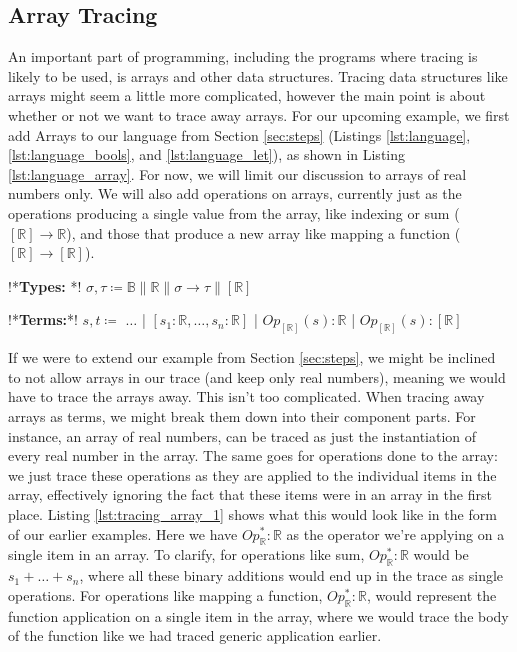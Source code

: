     \subsection{Array Tracing} \label{sec:arrays}
        An important part of programming, including the programs where tracing is likely to be used, is arrays and other data structures.
        Tracing data structures like arrays might seem a little more complicated, however the main point is about whether or not we want to trace away arrays.
        For our upcoming example, we first add Arrays to our language from Section \ref{sec:steps} (Listings \ref{lst:language}, \ref{lst:language_bools}, and \ref{lst:language_let}), as shown in Listing \ref{lst:language_array}.
        For now, we will limit our discussion to arrays of real numbers only.
        We will also add operations on arrays, currently just as the operations producing a single value from the array, like indexing or sum ($[\mathbb{R}]\to\mathbb{R}$), and those that produce a new array like mapping a function ($[\mathbb{R}]\to[\mathbb{R}]$).

        \begin{quicklst}[caption=Adding arrays, label=lst:language_array, gobble=12]
            !*\textbf{Types: }*!
                $\sigma,\tau\coloneqq\mathbb{B}\|\mathbb{R}\|\sigma\to\tau\|[\mathbb{R}]$

            !*\textbf{Terms:}*!
                $s,t\coloneqq$
                    $\dots$
                  | $[s_1:\mathbb{R},\dots,s_n:\mathbb{R}]$
                  | $Op_{[\mathbb{R}]}(s):\mathbb{R}$
                  | $Op_{[\mathbb{R}]}(s):[\mathbb{R}]$
        \end{quicklst}
        
        If we were to extend our example from Section \ref{sec:steps}, we might be inclined to not allow arrays in our trace (and keep only real numbers), meaning we would have to trace the arrays away.
        This isn't too complicated.
        When tracing away arrays as terms, we might break them down into their component parts.
        For instance, an array of real numbers, can be traced as just the instantiation of every real number in the array.
        The same goes for operations done to the array: we just trace these operations as they are applied to the individual items in the array, effectively ignoring the fact that these items were in an array in the first place.
        Listing \ref{lst:tracing_array_1} shows what this would look like in the form of our earlier examples.
        Here we have $Op^*_\mathbb{R}:\mathbb{R}$ as the operator we're applying on a single item in an array.
        To clarify, for operations like sum, $Op^*_\mathbb{R}:\mathbb{R}$ would be $s_1+\dots+s_n$, where all these binary additions would end up in the trace as single operations.
        For operations like mapping a function, $Op^*_\mathbb{R}:\mathbb{R}$, would represent the function application on a single item in the array, where we would trace the body of the function like we had traced generic application earlier.

